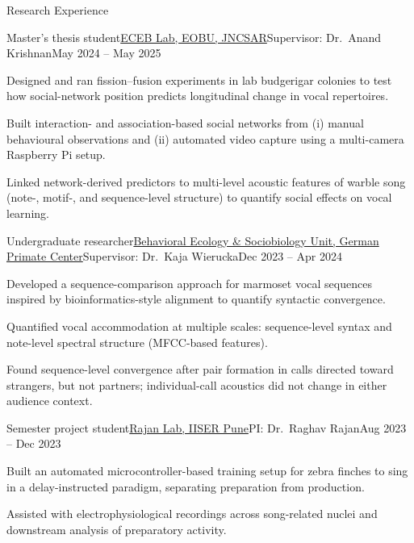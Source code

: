\documentclass{resume}
\begin{document}
\begin{rSection}{Research Experience}
\begin{rSubsection}{Master's thesis student}{\href{https://sites.google.com/view/eceb-lab}{ECEB Lab, EOBU, JNCSAR}}{Supervisor: Dr.\ Anand Krishnan}{May 2024 -- May 2025}
\item Designed and ran fission--fusion experiments in lab budgerigar colonies to test how social-network position predicts longitudinal change in vocal repertoires.
\item Built interaction- and association-based social networks from (i) manual behavioural observations and (ii) automated video capture using a multi-camera Raspberry Pi setup.
\item Linked network-derived predictors to multi-level acoustic features of warble song (note-, motif-, and sequence-level structure) to quantify social effects on vocal learning.
\end{rSubsection}

\begin{rSubsection}{Undergraduate researcher}{\href{https://www.dpz.eu/en/contact/staff/profile/person/kaja-wierucka.html}{Behavioral Ecology \& Sociobiology Unit, German Primate Center}}{Supervisor: Dr.\ Kaja Wierucka}{Dec 2023 -- Apr 2024}
\item Developed a sequence-comparison approach for marmoset vocal sequences inspired by bioinformatics-style alignment to quantify syntactic convergence.
\item Quantified vocal accommodation at multiple scales: sequence-level syntax and note-level spectral structure (MFCC-based features).
\item Found sequence-level convergence after pair formation in calls directed toward strangers, but not partners; individual-call acoustics did not change in either audience context.
\end{rSubsection}

\newpage
\begin{rSubsection}{Semester project student}{\href{https://raghavrajan.wixsite.com/rajanlab}{Rajan Lab, IISER Pune}}{PI: Dr.\ Raghav Rajan}{Aug 2023 -- Dec 2023}
\item Built an automated microcontroller-based training setup for zebra finches to sing in a delay-instructed paradigm, separating preparation from production.
\item Assisted with electrophysiological recordings across song-related nuclei and downstream analysis of preparatory activity.
\end{rSubsection}


\end{rSection}
\end{document}
